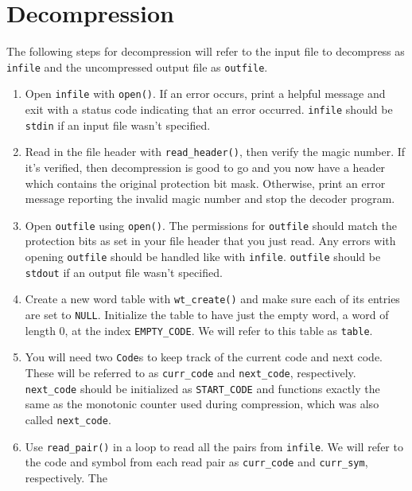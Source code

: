 \section{Decompression}\label{sec:decompression}

The following steps for decompression will refer to the input file to decompress
as \texttt{infile} and the uncompressed output file as \texttt{outfile}.

\begin{enumerate}
    \item Open \texttt{infile} with \texttt{open()}. If an error occurs, print a
      helpful message and exit with a status code indicating that an error
      occurred. \texttt{infile} should be \texttt{stdin} if an input file wasn't
      specified.
    \item Read in the file header with \texttt{read\_header()}, then verify the
      magic number. If it's verified, then decompression is good to go and you
      now have a header which contains the original protection bit mask.
      Otherwise, print an error message reporting the invalid magic number and
      stop the decoder program.
    \item Open \texttt{outfile} using \texttt{open()}. The permissions for
      \texttt{outfile} should match the protection bits as set in your file
      header that you just read. Any errors with opening \texttt{outfile} should
      be handled like with \texttt{infile}. \texttt{outfile} should be
      \texttt{stdout} if an output file wasn't specified.
    \item Create a new word table with \texttt{wt\_create()} and make sure each
      of its entries are set to \texttt{NULL}. Initialize the table to have just
      the empty word, a word of length 0, at the index \texttt{EMPTY\_CODE}. We
      will refer to this table as \texttt{table}.
    \item You will need two \texttt{Code}s to keep track of the current code and
      next code. These will be referred to as \texttt{curr\_code} and
      \texttt{next\_code}, respectively. \texttt{next\_code} should be
      initialized as \texttt{START\_CODE} and functions exactly the same as the
      monotonic counter used during compression, which was also called
      \texttt{next\_code}.
    \item Use \texttt{read\_pair()} in a loop to read all the pairs from
      \texttt{infile}. We will refer to the code and symbol from each read pair
      as \texttt{curr\_code} and \texttt{curr\_sym}, respectively. The

\end{enumerate}
